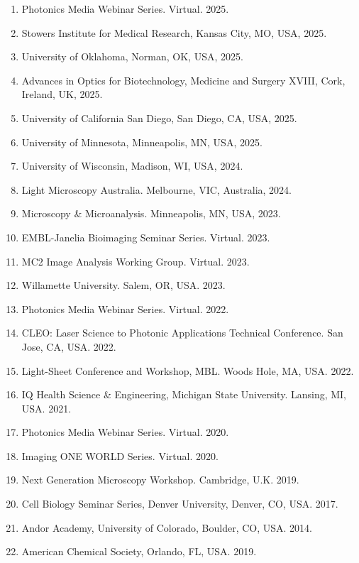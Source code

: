 \begin{enumerate}
\item Photonics Media Webinar Series.   Virtual. 2025.
\item Stowers Institute for Medical Research, Kansas City, MO, USA, 2025.
\item University of Oklahoma, Norman, OK, USA, 2025.
\item Advances in Optics for Biotechnology, Medicine and Surgery XVIII, Cork, Ireland, UK, 2025.
\item University of California San Diego, San Diego, CA, USA, 2025.
\item University of Minnesota, Minneapolis, MN, USA, 2025.
\item University of Wisconsin, Madison, WI, USA, 2024.
\item Light Microscopy Australia. Melbourne, VIC, Australia, 2024.
\item Microscopy \& Microanalysis. Minneapolis, MN, USA, 2023.
\item EMBL-Janelia Bioimaging Seminar Series. Virtual. 2023.
\item MC2 Image Analysis Working Group. Virtual. 2023.
\item Willamette University.  Salem, OR, USA. 2023.
\item Photonics Media Webinar Series.   Virtual. 2022.
\item CLEO: Laser Science to Photonic Applications Technical Conference. San Jose, CA, USA. 2022.
\item Light-Sheet Conference and Workshop, MBL.  Woods Hole, MA, USA. 2022.
\item IQ Health Science \& Engineering, Michigan State University. Lansing, MI, USA. 2021.
\item Photonics Media Webinar Series.  Virtual. 2020.
\item Imaging ONE WORLD Series. Virtual. 2020.
\item Next Generation Microscopy Workshop.  Cambridge, U.K. 2019.
\item Cell Biology Seminar Series, Denver University, Denver, CO, USA. 2017.
\item Andor Academy, University of Colorado, Boulder, CO, USA. 2014.
\item American Chemical Society, Orlando, FL, USA. 2019.
\end{enumerate}